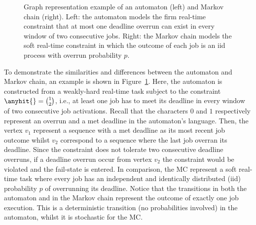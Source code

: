 \begin{figure}[t]
    \centering
    
    \caption{Graph representation example of an automaton (left) and Markov chain (right).
    Left: the automaton models the firm real-time constraint that at most one deadline overrun can exist in every window of two consecutive jobs.
    Right: the Markov chain models the soft real-time constraint in which the outcome of each job is an iid process with overrun probability $p$.}
    \label{fig:kappa:state-machine}
\end{figure}
%
To demonstrate the similarities and differences between the automaton and Markov chain, an example is shown in Figure~\ref{fig:kappa:state-machine}.
Here, the automaton is constructed from a weakly-hard real-time task subject to the constraint $\anyhit{} = \binom{1}{2}$, i.e., at least one job has to meet its deadline in every window of two consecutive job activations.
Recall that the characters $0$ and $1$ respectively represent an overrun and a met deadline in the automaton's language.
Then, the vertex $v_1$ represent a sequence with a met deadline as its most recent job outcome whilst $v_2$ correspond to a sequence where the last job overran its deadline.
Since the constraint does not tolerate two consecutive deadline overruns, if a deadline overrun occur from vertex $v_2$ the constraint would be violated and the fail-state is entered.
In comparison, the MC represent a soft real-time task where every job has an independent and identically distributed (iid) probability $p$ of overrunning its deadline.
Notice that the transitions in both the automaton and in the Markov chain represent the outcome of exactly one job execution.
This is a deterministic transition (no probabilities involved) in the automaton, whilst it is stochastic for the MC.



